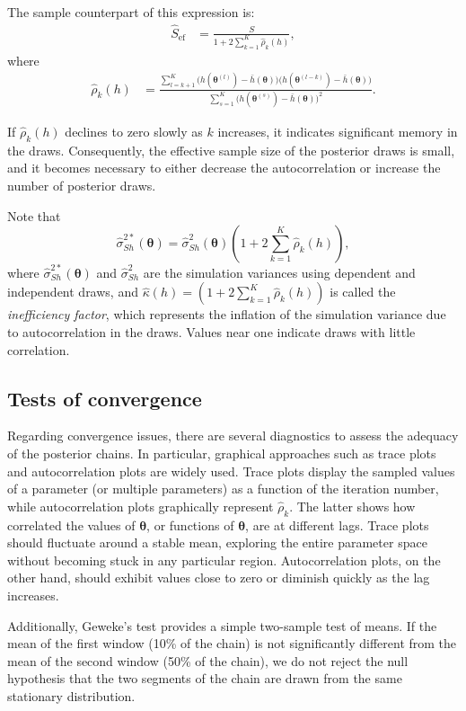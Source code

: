 The sample counterpart of this expression is:
\begin{align*}
	\hat{S}_{\text{ef}} &= \frac{S}{1 + 2\sum_{k=1}^{K} \hat{\rho}_k(h)},
\end{align*}
where
\begin{align*}
	\hat{\rho}_k(h) &= \frac{\sum_{l=k+1}^K \big(h(\bm{\theta}^{(l)}) - \bar{h}(\bm{\theta})\big)\big(h(\bm{\theta}^{(l-k)}) - \bar{h}(\bm{\theta})\big)}{\sum_{s=1}^K \big(h(\bm{\theta}^{(s)}) - \bar{h}(\bm{\theta})\big)^2}.
\end{align*}

If $\hat{\rho}_k(h)$ declines to zero slowly as $k$ increases, it indicates significant memory in the draws. Consequently, the effective sample size of the posterior draws is small, and it becomes necessary to either decrease the autocorrelation or increase the number of posterior draws.

Note that  
\[  
\hat{\sigma}^{2*}_{Sh}(\bm{\theta}) = \hat{\sigma}^2_{Sh}\left(\bm{\theta}\right) (1+2\sum_{k=1}^K \hat{\rho}_k(h)),  
\]  
where $\hat{\sigma}^{2*}_{Sh}(\bm{\theta})$ and $\hat{\sigma}^2_{Sh}$ are the simulation variances using dependent and independent draws, and $\hat{\kappa}(h) = (1+2\sum_{k=1}^K \hat{\rho}_k(h))$ is called the \textit{inefficiency factor}, which represents the inflation of the simulation variance due to autocorrelation in the draws. Values near one indicate draws with little correlation.  

 
\subsection{Tests of convergence}

Regarding convergence issues, there are several diagnostics to assess the adequacy of the posterior chains. In particular, graphical approaches such as trace plots and autocorrelation plots are widely used. Trace plots display the sampled values of a parameter (or multiple parameters) as a function of the iteration number, while autocorrelation plots graphically represent $\hat{\rho}_k$. The latter shows how correlated the values of $\bm{\theta}$, or functions of $\bm{\theta}$, are at different lags. Trace plots should fluctuate around a stable mean, exploring the entire parameter space without becoming stuck in any particular region. Autocorrelation plots, on the other hand, should exhibit values close to zero or diminish quickly as the lag increases.

Additionally, Geweke's test \cite{Geweke1992} provides a simple two-sample test of means. If the mean of the first window (10\% of the chain) is not significantly different from the mean of the second window (50\% of the chain), we do not reject the null hypothesis that the two segments of the chain are drawn from the same stationary distribution.

